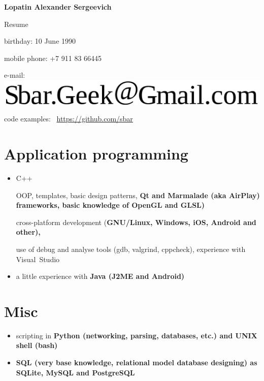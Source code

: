 \begin{center}
\fontsize{16pt}{14pt}\selectfont
\bfseries Lopatin Alexander Sergeevich\mdseries

\fontsize{14pt}{14pt}\selectfont
Resume
\end{center}

{
\fontsize{12pt}{12pt}\selectfont
\begin{flushright}
\item birthday: 10 June 1990
\item mobile phone: +7 911 83 66445
\item e-mail: \includegraphics[scale=0.2]{email}
\item code examples: \
\href{https://github.com/sbar?tab=repositories}{https://github.com/sbar}
\end{flushright}
}

\section{Application programming}
\begin{itemize}
\item C++

\subitem OOP, templates, basic design patterns,
\bfseries Qt \mdseries and
\bfseries Marmalade \mdseries (aka \bfseries AirPlay\mdseries) frameworks,
basic knowledge of \bfseries OpenGL \mdseries and \bfseries GLSL\mdseries)

\subitem cross-platform development
(\bfseries GNU/Linux\mdseries, Windows, iOS,
\bfseries Android \mdseries and other),

\subitem use of debug and analyse tools (gdb, valgrind, cppcheck),
experience with Visual~Studio

\item a little experience with \bfseries Java \mdseries (J2ME and Android)
\end{itemize}

\section{Misc}
\begin{itemize}
\item scripting in \bfseries Python \mdseries
(networking, parsing, databases, etc.) and
\bfseries UNIX shell (bash)\mdseries
\item \bfseries SQL \mdseries
(very base knowledge, relational model database designing)
as SQLite, MySQL and PostgreSQL
\end{itemize}

